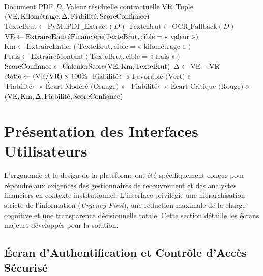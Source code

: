 \begin{algorithm}[H]
\caption{Algorithme d'extraction et de validation des données d'expertise}
\label{alg:extraction_ia}
\begin{algorithmic}[1]
\REQUIRE Document PDF $D$, Valeur résiduelle contractuelle $\text{VR}$
\ENSURE Tuple $(\text{VE}, \text{Kilométrage}, \Delta, \text{Fiabilité}, \text{ScoreConfiance})$
\STATE $\text{TexteBrut} \leftarrow \text{PyMuPDF\_Extract}(D)$
    \STATE $\text{TexteBrut} \leftarrow \text{OCR\_Fallback}(D)$
\ENDIF
\STATE $\text{VE} \leftarrow \text{ExtraireEntitéFinancière}(\text{TexteBrut}, \text{cible}=\text{« valeur »})$
\STATE $\text{Km} \leftarrow \text{ExtraireEntier}(\text{TexteBrut}, \text{cible}=\text{« kilométrage »})$
\STATE $\text{Frais} \leftarrow \text{ExtraireMontant}(\text{TexteBrut}, \text{cible}=\text{« frais »})$
\STATE $\text{ScoreConfiance} \leftarrow \text{CalculerScore}(\text{VE}, \text{Km}, \text{TexteBrut})$
\STATE $\Delta \leftarrow \text{VE} - \text{VR}$
\STATE $\text{Ratio} \leftarrow (\text{VE} / \text{VR}) \times 100\%$
    \STATE $\text{Fiabilité} \leftarrow \text{« Favorable (Vert) »}$
    \STATE $\text{Fiabilité} \leftarrow \text{« Écart Modéré (Orange) »}$
\ELSE
    \STATE $\text{Fiabilité} \leftarrow \text{« Écart Critique (Rouge) »}$
\ENDIF
\RETURN $(\text{VE}, \text{Km}, \Delta, \text{Fiabilité}, \text{ScoreConfiance})$
\end{algorithmic}
\end{algorithm}

\section{Présentation des Interfaces Utilisateurs}
\label{sec:interfaces}

L'ergonomie et le design de la plateforme \textbf{\projectShortTitle} ont été spécifiquement conçus pour répondre aux exigences des gestionnaires de recouvrement et des analystes financiers en contexte institutionnel. L'interface privilégie une hiérarchisation stricte de l'information (\textit{Urgency First}), une réduction maximale de la charge cognitive et une transparence décisionnelle totale. Cette section détaille les écrans majeurs développés pour la solution.

\subsection{Écran d'Authentification et Contrôle d'Accès Sécurisé}
\label{subsec:screen_login}

